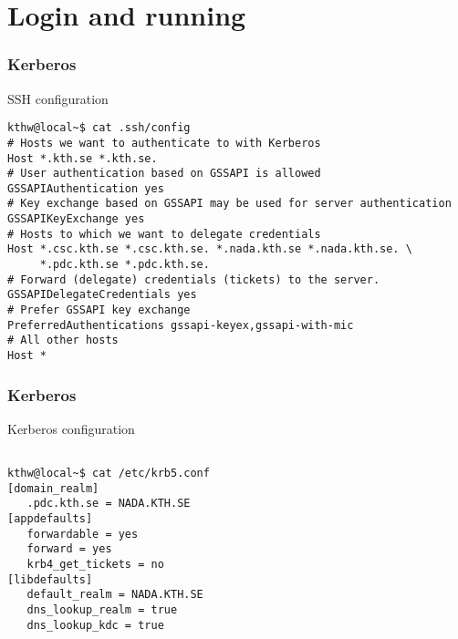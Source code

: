 \section*{Login and running}

\begin{frame}[fragile]
  \frametitle{Kerberos}
  \begin{alertblock}{SSH configuration}
    \verbatimfont{\footnotesize}
    \begin{verbatim}
kthw@local~$ cat .ssh/config
# Hosts we want to authenticate to with Kerberos
Host *.kth.se *.kth.se.
# User authentication based on GSSAPI is allowed
GSSAPIAuthentication yes
# Key exchange based on GSSAPI may be used for server authentication
GSSAPIKeyExchange yes
# Hosts to which we want to delegate credentials
Host *.csc.kth.se *.csc.kth.se. *.nada.kth.se *.nada.kth.se. \
     *.pdc.kth.se *.pdc.kth.se.
# Forward (delegate) credentials (tickets) to the server.
GSSAPIDelegateCredentials yes
# Prefer GSSAPI key exchange
PreferredAuthentications gssapi-keyex,gssapi-with-mic
# All other hosts
Host *

 \end{verbatim}
\end{alertblock}

\end{frame}



\begin{frame}[fragile]
  \frametitle{Kerberos}
  \begin{alertblock}{Kerberos configuration}
    \verbatimfont{\footnotesize}
    \begin{verbatim}

kthw@local~$ cat /etc/krb5.conf
[domain_realm]
   .pdc.kth.se = NADA.KTH.SE
[appdefaults]
   forwardable = yes
   forward = yes
   krb4_get_tickets = no
[libdefaults]
   default_realm = NADA.KTH.SE
   dns_lookup_realm = true
   dns_lookup_kdc = true

 \end{verbatim}
\end{alertblock}

\end{frame}



